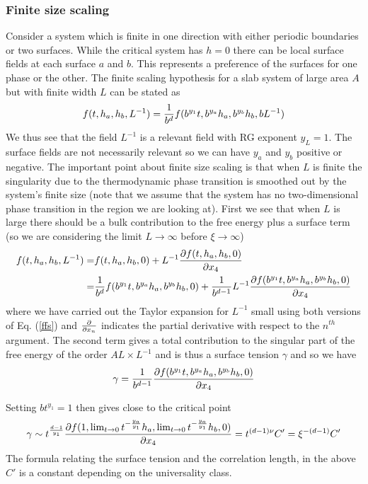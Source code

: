 \subsubsection{Finite size scaling}
Consider a system which is finite in one direction with either periodic boundaries or 
two surfaces. While the critical system has $h=0$ there can be local surface fields at each surface $a$ and $b$. This represents a preference of the surfaces for one phase or the other. 
The finite scaling hypothesis for a slab system of large area $A$ but with finite width $L$ can be stated as
\begin{equation}
f(t,h_a,h_b,L^{-1}) = {1\over b^{d}}f(b^{y_1}t, b^{y_a} h_a, b^{y_b} h_b, bL^{-1}) \label{ffs}
\end{equation}
We thus see that the field $L^{-1}$ is a relevant field with RG exponent $y_L=1$. 
The surface fields are not necessarily relevant so we can have $y_a$ and $y_b$ positive or negative. The important point about finite size scaling is that when $L$ is finite the singularity due to the thermodynamic phase transition is smoothed out by the system's finite size (note that we assume that the system has no two-dimensional phase transition in the region we are looking at). First we see that when $L$ is large there should be a bulk contribution to the free energy plus a surface term (so we are considering the limit $L\to\infty$ before $\xi\to\infty$)
\begin{align}
f(t,h_a,h_b,L^{-1}) =& f(t,h_a,h_b,0) + L^{-1}{\partial f(t,h_a,h_b,0)\over \partial x_4} \nonumber \\
=& {1\over b^d} f(b^{y_1}t, b^{y_a} h_a, b^{y_b} h_b,0)+{1\over b^{d-1}}L^{-1}{\partial f(b^{y_1}t, b^{y_a} h_a, b^{y_b} h_b, 0)\over \partial x_4}
\end{align}
where we have carried out the Taylor expansion for $L^{-1}$ small using both versions of Eq. (\ref{ffs}) and ${\partial \over \partial x_n}$ indicates the partial derivative with respect to the $n^{th}$ argument. 
The second term gives a total contribution to the singular part of the free energy of the order $AL \times L^{-1}$ and is thus a surface tension $\gamma$ and so we have
\begin{equation}
\gamma= {1\over b^{d-1}}{\partial f(b^{y_1}t, b^{y_a} h_a, b^{y_b} h_b, 0)\over \partial x_4}
\end{equation}


Setting $bt^{y_1}=1$ then gives close to the critical point
\begin{equation}
\gamma \sim t^{d-1\over y_1}{\partial f(1,\lim_{t\to 0} t^{-\frac{y_a}{y_1}}h_a, \lim_{t\to 0} t^{-\frac{y_a}{y_1}}h_b,0)\over \partial x_4} = t^{(d-1)\nu}C' = \xi^{-(d-1)}C'
\end{equation}
The formula relating the surface tension and the correlation length, in the above $C'$ is a constant depending on the universality class. 

